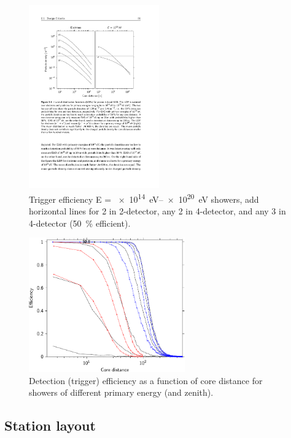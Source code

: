 \begin{figure}
    \centering
    \includegraphics[width=0.5\textwidth]
                    {plots/station/ldf_energies}
    \caption{Trigger efficiency E = \SIrange{e14}{e20}{\eV} showers, add horizontal lines for 2 in 2-detector, any 2 in 4-detector, and any 3 in 4-detector (\SI{50}{\percent} efficient).}
    \label{fig:ldf_energies2}
\end{figure}

\begin{figure}
    \centering
    \includegraphics[width=0.6\textwidth]
                    {plots/station/efficiency_two_16}
    \caption{Detection (trigger) efficiency as a function of core distance for showers of different primary energy (and zenith).}
    \label{fig:efficiency_two_16}
\end{figure}


\subsection{Station layout}
\label{sec:station_layout}

